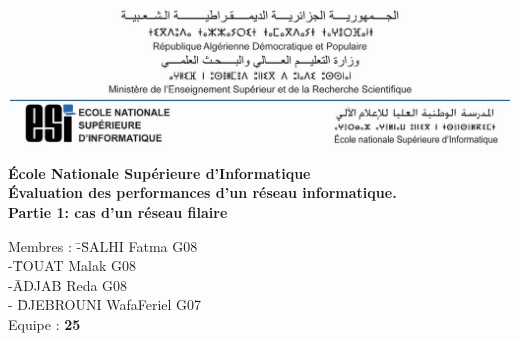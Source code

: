 \begin{center}
    \includegraphics[width=1\textwidth]{./images/esi_header.jpg} \\ 
    \vspace{1cm} 
    
    \Huge\textbf{École Nationale Supérieure d'Informatique} \\ 
    \vspace{3cm}
    \Huge \textbf{Évaluation des performances d’un réseau informatique.} \\
    
    \vspace{1cm}  
    \large \textbf{Partie 1: cas d’un réseau filaire} \\  
    \vspace{3cm} 
    \large
    \begin{tabbing}
    Membres : \=-\= SALHI Fatma G08 \\  
    \> -\= TOUAT Malak G08\\
    \> -\= ADJAB Reda G08\\
    \> - \= DJEBROUNI WafaFeriel G07 \\  
    Equipe : \textbf{25} \\
    \end{tabbing}
    \vspace{2cm} 
\end{center}
